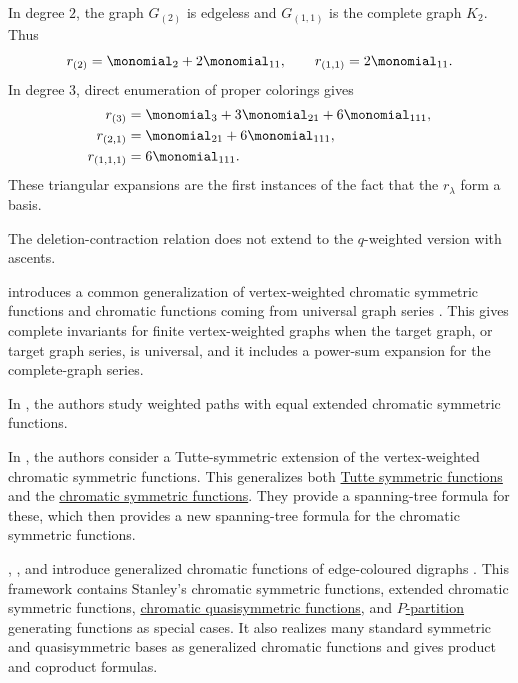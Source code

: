 \begin{example*}
In degree $2$, the graph $G_{(2)}$ is edgeless and $G_{(1,1)}$ is the
complete graph $K_2$.  Thus
\[
  r_{(2)}=\monomial_2+2\monomial_{11},
  \qquad
  r_{(1,1)}=2\monomial_{11}.
\]
In degree $3$, direct enumeration of proper colorings gives
\[
\begin{aligned}
  r_{(3)} &= \monomial_3+3\monomial_{21}+6\monomial_{111},\\
  r_{(2,1)} &= \monomial_{21}+6\monomial_{111},\\
  r_{(1,1,1)} &= 6\monomial_{111}.
\end{aligned}
\]
These triangular expansions are the first instances of the fact that the
$r_\lambda$ form a basis.
\end{example*}

The deletion-contraction relation does not extend to the $q$-weighted version with ascents.

 introduces a common generalization of vertex-weighted
chromatic symmetric functions and chromatic functions coming from universal
graph series \cite{Sato2024x}.  This gives complete invariants for finite
vertex-weighted graphs when the target graph, or target graph series, is
universal, and it includes a power-sum expansion for the complete-graph
series.

In \cite{AliniaeifardWangvanWilligenburg2021}, the authors study weighted paths with equal extended
chromatic symmetric functions.

In \cite{AliniaeifardWangvanWilligenburg2021}, the authors consider a Tutte-symmetric extension of the
vertex-weighted chromatic symmetric functions.
This generalizes both \hyperref[tutteSymmetric]{Tutte symmetric functions}
and the \hyperref[chromaticQuasisymmetric]{chromatic symmetric functions}. 
They provide a spanning-tree formula for these, which then provides a new
spanning-tree formula for the chromatic symmetric functions.

, , and
 introduce generalized chromatic functions
of edge-coloured digraphs \cite{AliniaeifardLiWilligenburg2024}.  This
framework contains Stanley's chromatic symmetric functions, extended
chromatic symmetric functions,
\hyperref[chromaticQuasisymmetric]{chromatic quasisymmetric functions}, and
\hyperref[pPartition]{$P$-partition} generating functions as special cases.
It also realizes many standard symmetric and quasisymmetric bases as
generalized chromatic functions and gives product and coproduct formulas.

